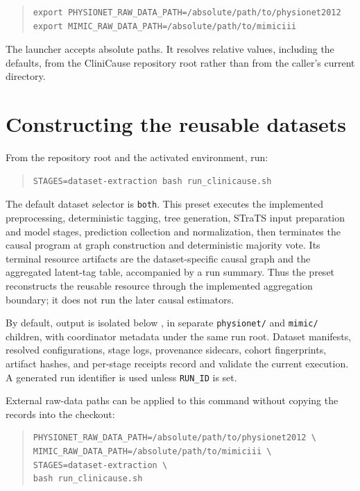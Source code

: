 \begin{quote}\small
\begin{verbatim}
export PHYSIONET_RAW_DATA_PATH=/absolute/path/to/physionet2012
export MIMIC_RAW_DATA_PATH=/absolute/path/to/mimiciii
\end{verbatim}
\end{quote}

The launcher accepts absolute paths. It resolves relative values, including
the defaults, from the CliniCause repository root rather than from the caller's
current directory.

\section{Constructing the reusable datasets}

From the repository root and the activated environment, run:

\begin{quote}\small
\begin{verbatim}
STAGES=dataset-extraction bash run_clinicause.sh
\end{verbatim}
\end{quote}

The default dataset selector is \texttt{both}. This preset executes the
implemented preprocessing, deterministic tagging, tree generation, STraTS input
preparation and model stages, prediction collection and normalization, then
terminates the causal program at graph construction and deterministic majority
vote. Its terminal resource artifacts are the dataset-specific causal graph
and the aggregated latent-tag table, accompanied by a run summary. Thus the
preset reconstructs the reusable resource through the implemented aggregation
boundary; it does not run the later causal estimators.

By default, output is isolated below , in separate
\texttt{physionet/} and \texttt{mimic/} children, with coordinator metadata
under the same run root. Dataset manifests, resolved configurations, stage logs, provenance
sidecars, cohort fingerprints, artifact hashes, and per-stage receipts record
and validate the current execution. A generated run identifier is used unless
\texttt{RUN\_ID} is set.

External raw-data paths can be applied to this command without copying the
records into the checkout:

\begin{quote}\small
\begin{verbatim}
PHYSIONET_RAW_DATA_PATH=/absolute/path/to/physionet2012 \
MIMIC_RAW_DATA_PATH=/absolute/path/to/mimiciii \
STAGES=dataset-extraction \
bash run_clinicause.sh
\end{verbatim}
\end{quote}

